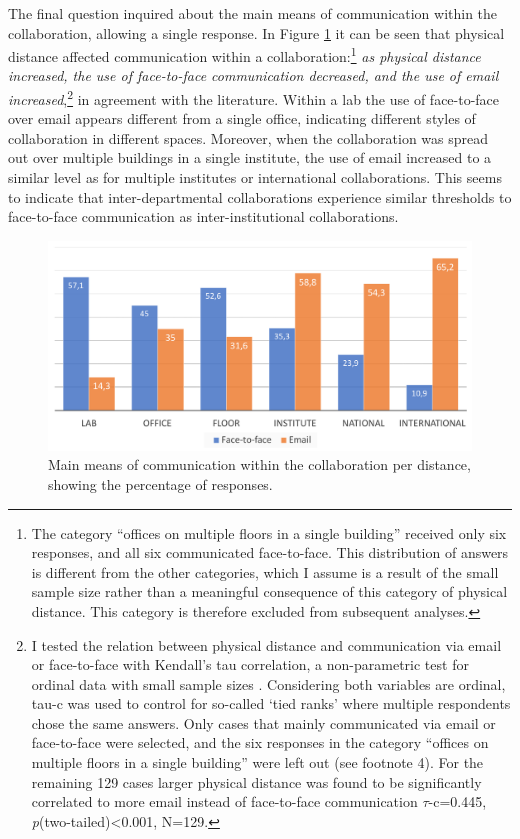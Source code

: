 \documentclass{article}
\begin{document}
The final question inquired about the main means of communication within the collaboration, allowing a single response. 
In Figure \ref{fig:barcomms} it can be seen that physical distance affected communication within a collaboration:\footnote{The category ``offices on multiple floors in a single building'' received only six responses, and all six communicated  face-to-face. This distribution of answers is different from the other categories, which I assume is a result of the small sample size rather than a meaningful consequence of this category of physical distance. This category is therefore excluded from subsequent analyses.} 
\textit{as physical distance increased, the use of face-to-face communication decreased, and the use of email increased},\footnote{I tested the relation between physical distance and communication via email or face-to-face with Kendall's tau correlation, a non-parametric test for ordinal data with small sample sizes \citep[pp. 181-182]{Field2009}. Considering both variables are ordinal, tau-c was used to control for so-called `tied ranks' where multiple respondents chose the same answers. Only cases that mainly communicated via email or face-to-face were selected, and the six responses in the category ``offices on multiple floors in a single building'' were left out (see footnote 4). For the remaining 129 cases larger physical distance was found to be significantly correlated to more email instead of face-to-face communication $\tau$-c=0.445, \textit{p}(two-tailed)\textless0.001, N=129.}
in agreement with the literature.
Within a lab the use of face-to-face over email appears different from a single office, indicating different styles of collaboration in different spaces. 
Moreover, when the collaboration was spread out over multiple buildings in a single institute, the use of email increased to a similar level as for multiple institutes or international collaborations. This seems to indicate that inter-departmental collaborations experience similar thresholds to face-to-face communication as inter-institutional collaborations.

\begin{figure}  
\begin{center}  
\includegraphics[width=1.0\linewidth]{barcomms.png}  
\caption{Main means of communication within the collaboration per distance, showing the percentage of responses.\label{fig:barcomms}}  
\end{center}  
\end{figure}
\end{document}
